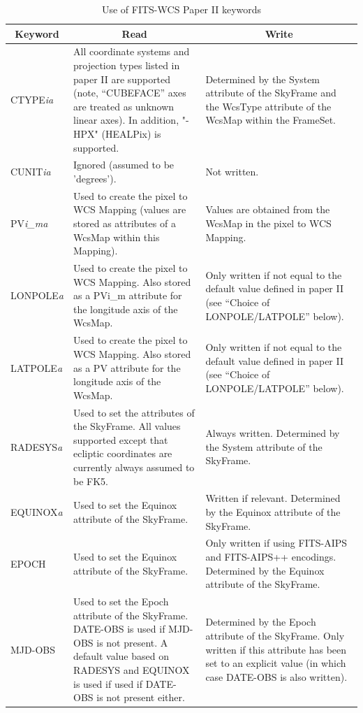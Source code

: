\documentclass[twoside,11pt]{article}
\newcommand{\fitskey}[3]{{#1}&{#2}&{#3}\\}
\begin{document}
\begin{table}[htbp]
\begin{tabular}{|l|p{2.5in}|p{2.5in}|}
\hline
\multicolumn{1}{|c|}{{\bf Keyword}} & \multicolumn{1}{c|}{{\bf Read}} 
& \multicolumn{1}{c|}{{\bf Write}} \\ \hline

\fitskey{CTYPE\emph{ia}}{All coordinate systems and projection types
listed in paper II are supported (note, ``CUBEFACE'' axes are treated as
unknown linear axes). In addition, "-HPX" (HEALPix) is supported.}{Determined by the System attribute 
of the SkyFrame and the WcsType attribute of the
WcsMap within the FrameSet.}

\fitskey{CUNIT\emph{ia}}{Ignored (assumed to be 'degrees').}{Not written.}

\fitskey{PV\emph{i\_ma}}{Used to create the pixel to WCS Mapping (values
are stored as attributes of a WcsMap within this Mapping).}{Values are
obtained from the WcsMap in the pixel to WCS Mapping.}

\fitskey{LONPOLE\emph{a}}{Used to create the pixel to WCS Mapping. Also
stored as a PVi\_m attribute for the longitude axis of the WcsMap.}{Only
written if not equal to the default value defined in paper II (see
``Choice of LONPOLE/LATPOLE'' below).}

\fitskey{LATPOLE\emph{a}}{Used to create the pixel to WCS Mapping. Also
stored as a PV attribute for the longitude axis of the WcsMap.}{Only
written if not equal to the default value defined in paper II (see
``Choice of LONPOLE/LATPOLE'' below).}

\fitskey{RADESYS\emph{a}}{Used to set the attributes of the SkyFrame. All
values supported except that ecliptic coordinates are currently always
assumed to be FK5.}{Always written. Determined by the System attribute of
the SkyFrame.}

\fitskey{EQUINOX\emph{a}}{Used to set the Equinox attribute 
of the SkyFrame.}{Written if relevant. Determined by the Equinox attribute of
the SkyFrame.}

\fitskey{EPOCH}{Used to set the Equinox attribute of the SkyFrame.}{Only
written if using FITS-AIPS and FITS-AIPS++ encodings. Determined by the Equinox attribute
of the SkyFrame.}

\fitskey{MJD-OBS}{Used to set the Epoch attribute of the 
SkyFrame. DATE-OBS is used if MJD-OBS is not present. A default value based on
RADESYS and EQUINOX is used if used if DATE-OBS is not present
either.}{Determined by the Epoch attribute of the SkyFrame. Only written
if this attribute has been set to an explicit value (in which case
DATE-OBS is also written).}

\hline
\end{tabular}
\vspace{3.mm}
\caption{Use of FITS-WCS Paper II keywords}
\label{tab:fitspaper2}
\end{table}
\end{document}
